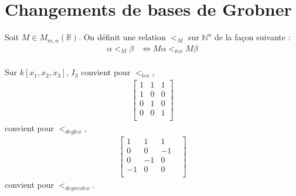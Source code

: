 \chapter{Changements de bases de Grobner}
    \begin{defi}
        Soit $M \in M_{m,n}(\mathbb{R})$. On définit une relation $<_M$ sur $\mathbb{N}^n$ de la façon suivante :
        \begin{align*}
            \alpha <_M \beta &\iff M \alpha <_{lex} M \beta \\
        \end{align*}
    \end{defi}
    \begin{expl}
        Sur $k[x_1, x_2, x_3]$, $I_3$ convient pour $<_{lex}$,
        \begin{align*}
            \begin{bmatrix}
                1 & 1 & 1 \\
                1 & 0 & 0 \\
                0 & 1 & 0 \\
                0 & 0 & 1 \\
            \end{bmatrix}
        \end{align*}
        convient pour $<_{deglex}$,
        \begin{align*}
            \begin{bmatrix}
                1 & 1 & 1 \\
                0 & 0 & -1 \\
                0 & -1 & 0 \\
                -1 & 0 & 0 &\\
            \end{bmatrix}
        \end{align*}
        convient pour $<_{degrevlex}$.
    \end{expl}